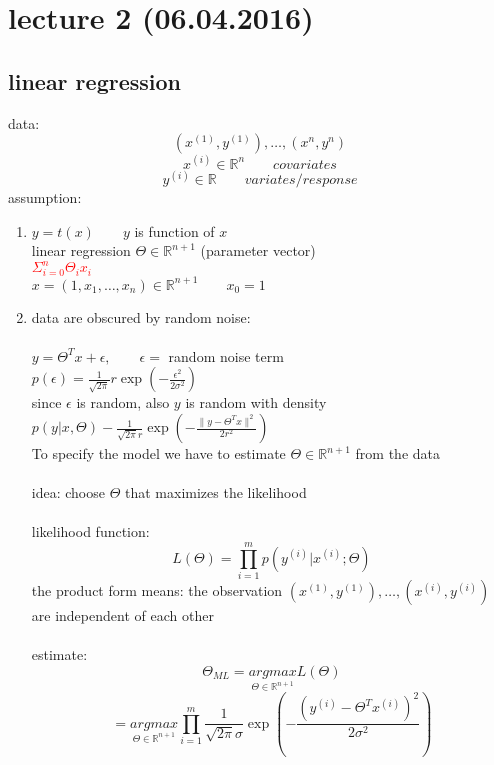 \section*{lecture 2 (06.04.2016)}
\subsection*{linear regression}
data: \space \[(x^{(1)}, y^{(1)}), \dots , (x^{n}, y^{n})\]
\[x^{(i)} \in \mathbb{R}^n \quad\quad covariates\]
\[y^{(i)} \in \mathbb{R} \quad\quad variates/response \]
assumption:
\begin{enumerate}[(1)]
\item $y = t(x) \quad\quad y$ is function of $x$\\
linear regression \space\space {} \space $\Theta \in \mathbb{R}^{n+1}$ (parameter vector)\\
\textcolor{red}{\quad\quad\quad\quad\quad\quad\quad\quad\quad$\Sigma^n_{i = 0} \Theta_i x_i$}\\
$x= (1,x_1, \dots ,x_n) \in \mathbb{R}^{n+1} \quad \quad x_0 = 1$
\item data are obscured by random noise:\\\\
$y = \Theta^T x +\epsilon, \quad\quad \epsilon = $ random noise term\\
$p(\epsilon) = \frac{1}{\sqrt{2\pi}} r \exp (- \frac{\epsilon^2}{2 \sigma^2})$\\
since $\epsilon$ is random, also $y$ is random with density $p(y|x, \Theta) - \frac{1}{\sqrt{2\pi}r} \exp (- \frac{\lVert y- \Theta^T x\lVert^2}{2r^2})$\\
To specify the model we have to estimate $\Theta \in \mathbb{R}^{n+1}$ from the data\\\\
idea: choose $\Theta$ that maximizes the likelihood\\\\
likelihood function:
\[L(\Theta) = \prod^m_{i=1} p(y^{(i)}|x^{(i)};\Theta)\]
the product form means: the observation $(x^{(1)},y^{(1)}), \dots , (x^{(i)}, y^{(i)})$ are independent of each other\\\\
estimate:
\[ \Theta_{ML} = \underset{\Theta \in \mathbb{R}^{n+1}}{argmax} L(\Theta) \]
\[ = \underset{\Theta \in \mathbb{R}^{n+1}}{argmax} \prod^m_{i=1} \frac{1}{\sqrt{2 \pi} \sigma} \exp \left(- \frac{(y^{(i)} - \Theta^T x^{(i)})^2}{2 \sigma^2}\right)\]

\end{enumerate}
